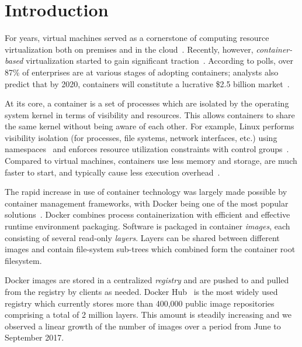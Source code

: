 \section{Introduction}

For years, virtual machines served as a cornerstone of computing resource
virtualization both on premises and in the cloud~\cite{rosenblum2005virtual}.
%
Recently, however, \emph{container-based} virtualization started to gain
significant traction~\cite{process-containers-linux}.
%
According to polls, over 87\% of enterprises are at various stages of adopting
containers; analysts also predict that by 2020, containers will constitute a
lucrative \$2.5 billion market~\cite{container-grow-by2020}.


At its core, a container is a set of processes which are isolated by the operating
system kernel in terms of visibility and resources. This allows containers to
share the same kernel without being aware of each other.
%
For example, Linux performs visibility isolation (for processes, file systems,
network interfaces, etc.) using namespaces~\cite{man-namespaces} and enforces
resource utilization constraints with control groups~\cite{kernel-doc-cgroups}.
%
Compared to virtual machines, containers use less memory and storage, are much
faster to start, and typically cause less execution
overhead~\cite{felter2015updated, Disco, HypervisorsvsLightweight}.

The rapid increase in use of container technology was largely made possible by
container management frameworks, with Docker being one of the most popular
solutions~\cite{docker}.
%
Docker combines process containerization with efficient and effective runtime
environment packaging.
%
Software is packaged in container \emph{images}, each consisting of several
read-only \emph{layers}. Layers can be shared between different images and
contain file-system sub-trees which combined form the container root filesystem.


Docker images are stored in a centralized \emph{registry} and are pushed to and
pulled from the registry by clients as needed.
%
Docker Hub~\cite{docker-hub} is the most widely used registry which currently
stores more than 400,000 public image repositories comprising a total of 2 million
layers.
%
This amount is steadily increasing and we observed a linear growth of the
number of images over a period from June to September 2017.



